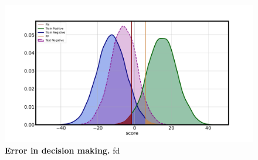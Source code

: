 \documentclass{article}
\begin{document}
\begin{figure}
	\centering
	\includegraphics[width=5in]{img/synthetic_overview.pdf}
	\caption{{\bf Error in decision making.} fd}
	\label{fig:illustration}
\end{figure}  





 \

 \
 
\end{document}
